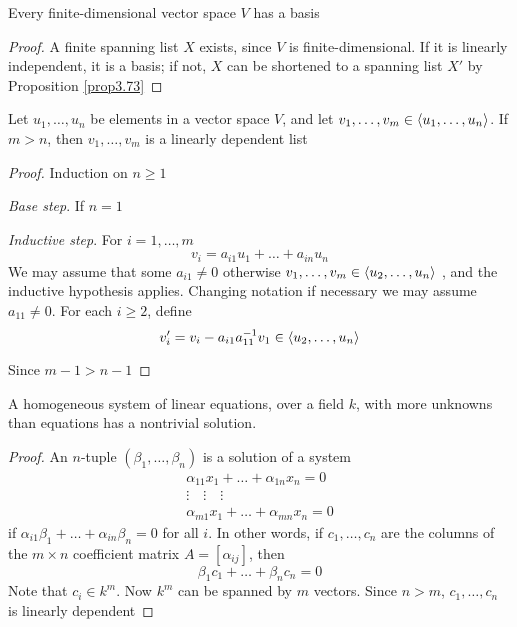 \documentclass[11pt]{article}
\begin{document}
\begin{theorem}[]
Every finite-dimensional vector space \(V\) has a basis
\end{theorem}

\begin{proof}
A finite spanning list \(X\) exists, since \(V\) is finite-dimensional. If it
is  linearly independent, it is a basis; if not, \(X\) can be shortened to a
spanning list \(X'\) by Proposition \ref{prop3.73}
\end{proof}

\begin{lemma}[]
Let \(u_1,\dots,u_n\) be elements in a vector space \(V\), and let
\(v_1,\dots,v_m\in\langle u_1,\dots,u_n\rangle\). If \(m>n\), then \(v_1,\dots,v_m\)
is a linearly dependent list
\end{lemma}

\begin{proof}
Induction on \(n\ge 1\)

\emph{Base step}. If \(n=1\)

\emph{Inductive step}. For \(i=1,\dots,m\)
\begin{equation*}
v_i=a_{i1}u_1+\dots+a_{in}u_n
\end{equation*}
We may assume that some \(a_{i1}\neq0\) otherwise 
\(v_1,\dots,v_m\in\langle u_2,\dots,u_n\rangle\) , and the inductive hypothesis
applies. Changing notation 
if necessary we may assume \(a_{11}\neq 0\). For each \(i\ge 2\), define
\begin{equation*}
v_i'=v_i-a_{i1}a_{11}^{-1}v_1\in\langle u_2,\dots,u_n\rangle
\end{equation*}

Since \(m-1>n-1\)
\end{proof}

\begin{corollary}[]
A homogeneous system of linear equations, over a field \(k\), with more
unknowns than equations has a nontrivial solution.
\end{corollary}

\begin{proof}
An \(n\)-tuple \((\beta_1,\dots,\beta_n)\) is a solution of a system
\begin{gather*}
\alpha_{11}x_1+\dots+\alpha_{1n}x_n=0\\
\vdots\quad\vdots\quad\vdots\\
\alpha_{m1}x_1+\dots+\alpha_{mn}x_n=0
\end{gather*}
if \(\alpha_{i1}\beta_1+\dots+\alpha_{in}\beta_n=0\) for all \(i\). In other
words, if \(c_1,\dots,c_n\) are the columns of the \(m\times n\) coefficient
matrix \(A=[\alpha_{ij}]\), then 
\begin{equation*}
\beta_1c_1+\dots+\beta_nc_n=0
\end{equation*}
Note that \(c_i\in k^m\). Now \(k^m\) can be spanned by \(m\) vectors. Since
\(n>m\), \(c_1,\dots,c_n\) is linearly dependent
\end{proof}
\end{document}
